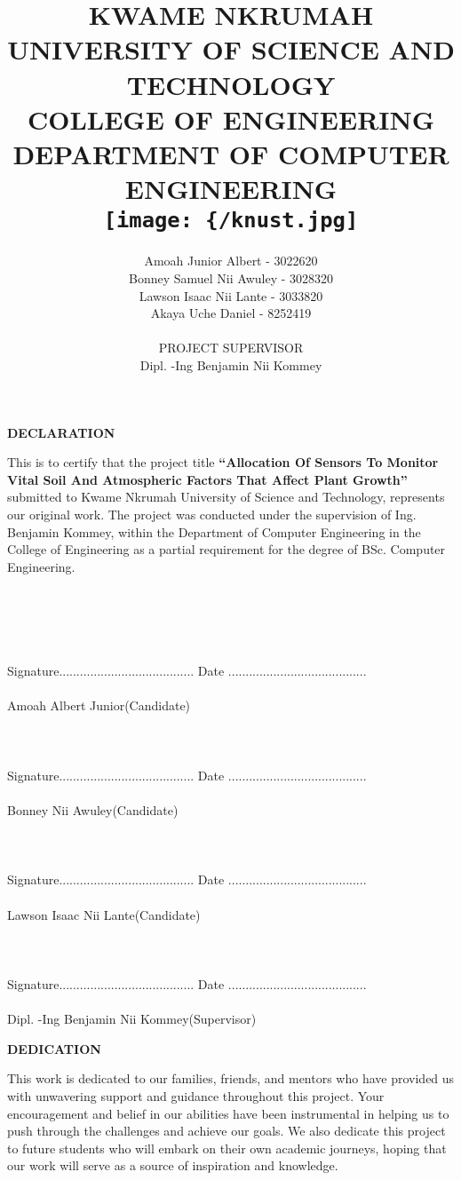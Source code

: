 \documentclass[12pt, a4paper]{article}
\title{KWAME NKRUMAH UNIVERSITY OF SCIENCE AND TECHNOLOGY\\
COLLEGE OF ENGINEERING\\
DEPARTMENT OF COMPUTER ENGINEERING\\ 
\texttt{[image: \{/knust.jpg]}} 
\\ALLOCATION OF SENSORS TO MONITOR VITAL SOIL AND ATMOSPHERIC FACTORS THAT AFFECT PLANT GROWTH\\ Case Study: KNUST Peasant Farms}
\author{Amoah Junior Albert - 3022620\\ Bonney Samuel Nii Awuley - 3028320 \\ Lawson Isaac Nii Lante - 3033820 \\Akaya Uche Daniel - 8252419\\ \\ PROJECT SUPERVISOR\\ Dipl. -Ing Benjamin Nii Kommey}
\begin{document}
\maketitle
\thispagestyle{empty}
\newpage

\begin{center}
\textbf{DECLARATION}
\end{center}
This is to certify that the project title \textbf{``Allocation Of Sensors To Monitor Vital Soil And Atmospheric Factors That Affect Plant Growth''} submitted to Kwame Nkrumah University of Science and Technology, represents our original work. The project was conducted under the supervision of Ing. Benjamin Kommey, within the Department of Computer Engineering in the College of Engineering as a partial requirement for the degree of BSc. Computer Engineering.\\ \\ \\  \\ \\ \\
Signature....................................... Date ........................................\\ \\
Amoah Albert Junior(Candidate)\\ \\ \\ \\
Signature....................................... Date ........................................\\ \\
Bonney Nii Awuley(Candidate)\\ \\  \\ \\
Signature....................................... Date ........................................\\ \\
Lawson Isaac Nii Lante(Candidate)\\ \\ \\ \\
Signature....................................... Date ........................................\\ \\
Dipl. -Ing Benjamin Nii Kommey(Supervisor)
\newpage

\begin{center}
\textbf{DEDICATION}
\end{center}
This work is dedicated to our families, friends, and mentors who have provided us with unwavering support and guidance throughout this project. Your encouragement and belief in our abilities have been instrumental in helping us to push through the challenges and achieve our goals. We also dedicate this project to future students who will embark on their own academic journeys, hoping that our work will serve as a source of inspiration and knowledge.
\newpage
\end{document}
